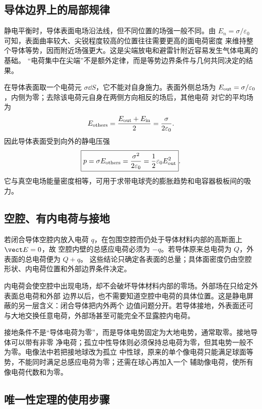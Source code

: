 \subsection*{导体边界上的局部规律}

静电平衡时，导体表面电场沿法线，但不同位置的场强一般不同。由
$E_n=\sigma/\varepsilon_0$ 可知，表面曲率较大、尖锐程度较高的位置往往需要更高的面电荷密度
来维持整个导体等势，因而附近场强更大。这是尖端放电和避雷针附近容易发生气体电离的基础。
“电荷集中在尖端”不是额外定律，而是等势边界条件与几何共同决定的结果。

在导体表面取一个电荷元 $\sigma\dd S$，它不能对自身施力。表面外侧总场为
$E_{\rm out}=\sigma/\varepsilon_0$，内侧为零；去除该电荷元自身在两侧方向相反的场后，其他电荷
对它的平均场为
\begin{equation}
 E_{\rm others}=\frac{E_{\rm out}+E_{\rm in}}2
 =\frac\sigma{2\varepsilon_0}.
\end{equation}
因此导体表面受到向外的静电压强
\begin{equation}
 \boxed{p=\sigma E_{\rm others}=\frac{\sigma^2}{2\varepsilon_0}
 =\frac12\varepsilon_0E_{\rm out}^2}.
\end{equation}
它与真空电场能量密度相等，可用于求带电球壳的膨胀趋势和电容器极板间的吸力。

\subsection*{空腔、有内电荷与接地}

若闭合导体空腔内放入电荷 $q$，在包围空腔而仍处于导体材料内部的高斯面上 $\vect E=0$，故
空腔内壁的总感应电荷必须为 $-q$。若导体原来总电荷为 $Q$，外表面的总电荷便为 $Q+q$。
这些结论只确定各表面的总量；具体面密度仍由空腔形状、内电荷位置和外部边界条件决定。

内电荷会使空腔中出现电场，却不会破坏导体材料内部的零场。外部场在只给定外表面总电荷和外部
边界以后，也不需要知道空腔中电荷的具体位置。这是静电屏蔽的另一层含义：闭合导体把内外两个
边值问题分开。若导体接地，外表面还可与大地交换任意电荷，外部场甚至可能完全不显露腔内电荷。

接地条件不是“导体电荷为零”，而是导体电势固定为大地电势，通常取零。接地导体可以带有非零
净电荷；孤立中性导体则必须保持总电荷为零，但其电势一般不为零。电像法中若把接地球改为孤立
中性球，原来的单个像电荷只能满足球面等势，不能同时满足总感应电荷为零；还需在球心再加入一个
辅助像电荷，使所有像电荷代数和为零。

\subsection*{唯一性定理的使用步骤}

